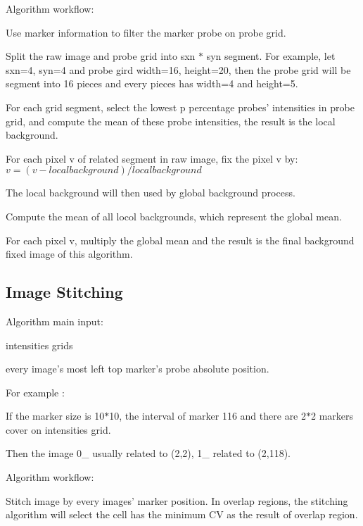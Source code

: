 Algorithm workflow\-:


\begin{DoxyEnumerate}
\item Use marker information to filter the marker probe on probe grid.
\item Split the raw image and probe grid into sxn $\ast$ syn segment. For example, let sxn=4, syn=4 and probe gird width=16, height=20, then the probe grid will be segment into 16 pieces and every pieces has width=4 and height=5.
\item For each grid segment, select the lowest p percentage probes' intensities in probe grid, and compute the mean of these probe intensities, the result is the local background.
\item For each pixel v of related segment in raw image, fix the pixel v by\-: $ v = (v - local background) / local background $
\item The local background will then used by global background process.
\begin{DoxyEnumerate}
\item Compute the mean of all locol backgrounds, which represent the global mean.
\item For each pixel v, multiply the global mean and the result is the final background fixed image of this algorithm. 
\end{DoxyEnumerate}
\end{DoxyEnumerate}\hypertarget{improc_stitiching}{}\subsection{Image Stitching}\label{improc_stitiching}
Algorithm main input\-:


\begin{DoxyItemize}
\item intensities grids
\item every image's most left top marker's probe absolute position.

For example \-:

If the marker size is 10$\ast$10, the interval of marker 116 and there are 2$\ast$2 markers cover on intensities grid. \par
 Then the image 0\-\_ usually related to (2,2), 1\-\_ related to (2,118).
\end{DoxyItemize}

Algorithm workflow\-:

Stitch image by every images' marker position. In overlap regions, the stitching algorithm will select the cell has the minimum C\-V as the result of overlap region. 